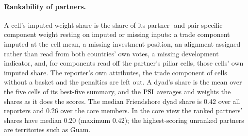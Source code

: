 \paragraph{Rankability of partners.} A cell's imputed weight share is the share of its partner- and
pair-specific component weight resting on imputed or missing inputs: a trade component imputed at
the cell mean, a missing investment position, an alignment assigned rather than read from both
countries' own votes, a missing development indicator, and, for components read off the partner's
pillar cells, those cells' own imputed share. The reporter's own attributes, the trade component of
cells without a basket and the penalties are left out. A dyad's share is the mean over the five
cells of its best-five summary, and the $\mathrm{PSI}$ averages and weights the shares as it does the scores.
The median Friendshore dyad share is 0.42 over all reporters and 0.26 over the core members. In the
core view the ranked partners' shares have median 0.20 (maximum 0.42); the highest-scoring unranked
partners are territories such as Guam.

